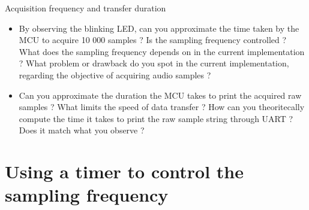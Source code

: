 \begin{bclogo}[couleur = gray!20, arrondi = 0.2, logo=\bcquestion]{Acquisition frequency and transfer duration}
\begin{itemize}
    \item By observing the blinking LED, can you approximate the time taken by the MCU to acquire 10 000 samples ? Is the sampling frequency controlled ? What does the sampling frequency depends on in the current implementation ? What problem or drawback do you spot in the current implementation, regarding the objective of acquiring audio samples ?
    \item Can you approximate the duration the MCU takes to print the acquired raw samples ? What limits the speed of data transfer ? How can you theoritecally compute the time it takes to print the raw sample string through UART ? Does it match what you observe ?
\end{itemize}
\end{bclogo}

\newpage

\section{Using a timer to control the sampling frequency}

